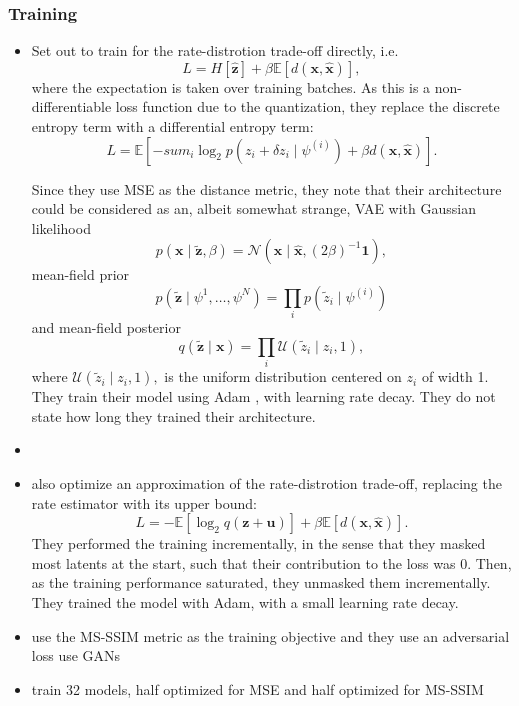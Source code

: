 \documentclass{article}
\renewcommand{\vec}[1]{\mathbf{#1}}
\newcommand{\Exp}{\mathbb{E}}
\newcommand{\Norm}{\mathcal{N}}
\newcommand{\Unif}{\mathcal{U}}
\begin{document}
\subsubsection{Training}
\par
\begin{itemize}
\item \cite{balle2016end} Set out to train for the rate-distrotion trade-off
  directly, i.e.
  \[
    L = H[\vec{\hat{z}}] + \beta \Exp[d(\vec{x}, \vec{\hat{x}})],
  \]
  where the expectation is taken over training batches.
  As this is a non-differentiable loss function due to the quantization, they
  replace the discrete entropy term with a differential entropy term:
  \[
   L = \Exp\left[ -sum_i \log_2 p(z_i + \delta z_i \mid \psi^{(i)}) +
                     \beta d(\vec{x}, \vec{\hat{x}})\right].
  \]
  \par Since they use MSE as the distance metric, they note that their
  architecture could be considered as an, albeit somewhat
  strange, VAE with Gaussian likelihood
  \[
    p(\vec{x} \mid \vec{\tilde{z}}, \beta) =
    \Norm(\vec{x} \mid \vec{\hat{x}}, (2\beta)^{-1}\vec{1}),
  \]
  mean-field prior
  \[
    p(\vec{\tilde{z}} \mid \psi^{1}, \hdots, \psi^{N}) =
    \prod_i p(\tilde{z}_i \mid \psi^{(i)})
  \]
  and mean-field posterior
  \[
    q(\vec{\tilde{z}} \mid \vec{x}) =
    \prod_i \Unif(\tilde{z}_i \mid z_i, 1),
  \]
  where $\Unif(\tilde{z}_i \mid z_i, 1),$ is the uniform distribution centered
  on $z_i$ of width 1. They train their model using Adam \cite{kingma2014adam},
  with learning rate decay. They do not state how long they trained their
  architecture.
  
\item \cite{toderici2017full}
\item \cite{theis2017lossy}
  also optimize an approximation of the rate-distrotion trade-off, replacing the
  rate estimator with its upper bound:
  \[
    L = -\Exp[\log_2 q(\vec{z} + \vec{u})] + \beta \Exp[d(\vec{x}, \vec{\hat{x}})].
  \]
  They performed the training incrementally, in the sense that they masked most
  latents at the start, such that their contribution to the loss was 0. Then, as
  the training performance saturated, they unmasked them incrementally.
  They trained the model with Adam, with a small learning rate decay.
\item \cite{rippel2017real} use the MS-SSIM metric as the training objective and
  they use an adversarial loss 
  \cite{rippel2017real} use GANs \cite{goodfellow2014generative}
\item \cite{balle2018variational} train 32 models, half optimized for MSE and
  half optimized for MS-SSIM
\end{itemize}
\end{document}
